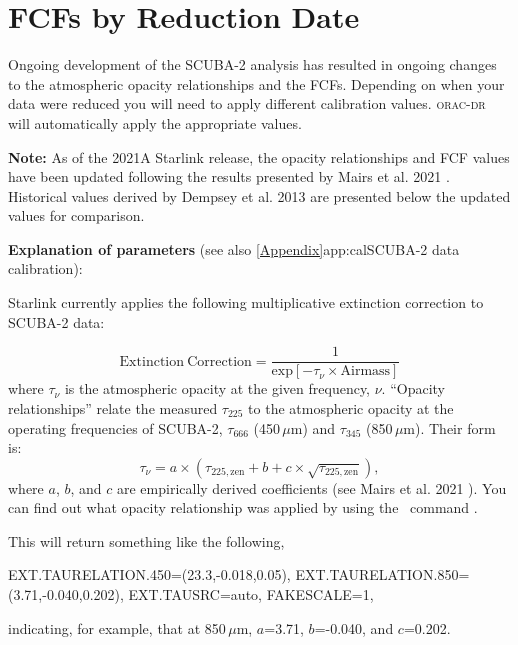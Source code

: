\chapter{FCFs by Reduction Date}
\label{app:fcfs}

Ongoing development of the SCUBA-2 analysis has resulted in ongoing
changes to the atmospheric opacity relationships and the FCFs.
Depending on when your data were reduced you will need to apply
different calibration values. \textsc{orac-dr} will automatically apply
the appropriate values.

\textbf{Note:} As of the 2021A Starlink release, the
opacity relationships and FCF values have been updated following the
results presented by Mairs et al. 2021 \cite{mairs21}. Historical values derived by Dempsey et al. 2013
\cite{dempsey12} are presented below the updated values for comparison.

\vspace{1cm}

\textbf{Explanation of parameters} (see also \cref{Appendix}{app:cal}{SCUBA-2 data calibration}):

Starlink currently applies the following multiplicative extinction correction to SCUBA-2 data:

\begin{equation}
\mathrm{Extinction\:Correction} = \frac{1}{\mathrm{exp}[-\tau_{\nu}\times\mathrm{Airmass}]}
\end{equation}
where $\tau_{\nu}$ is the atmospheric opacity at the given frequency, $\nu$. ``Opacity relationships''
relate the measured $\tau_{225}$ to the atmospheric opacity at the operating frequencies of
SCUBA-2, $\tau_{666}$ (450\,$\mu$m) and $\tau_{345}$ (850\,$\mu$m). Their form is:
\begin{equation}
\label{eq:2021taurelation}
\tau_{\nu} = a\times(\tau_{225,\mathrm{zen}} + b + c\times\sqrt{\tau_{225,\mathrm{zen}}}),
\end{equation}
where $a$, $b$, and $c$ are empirically derived coefficients (see Mairs et al. 2021 \cite{mairs21}).
You can find out what opacity relationship was applied by using the \Kappa\ command \hislist.

\begin{terminalv}
\end{terminalv}

This will return something like the following,
\begin{terminalv}
      EXT.TAURELATION.450=(23.3,-0.018,0.05),
      EXT.TAURELATION.850=(3.71,-0.040,0.202), EXT.TAUSRC=auto, FAKESCALE=1,
\end{terminalv}
indicating, for example, that at 850\,$\mu$m, $a$=3.71, $b$=-0.040, and $c$=0.202.

